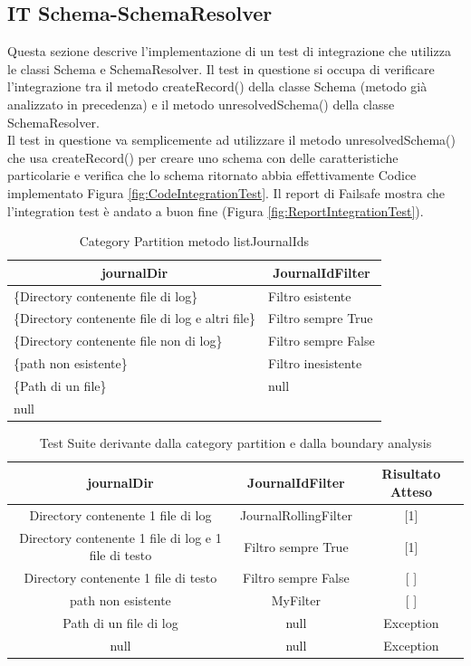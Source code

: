 \documentclass[12pt, a4paper]{article}
\begin{document}
\subsection{IT Schema-SchemaResolver}
Questa sezione descrive l'implementazione di un test di integrazione che utilizza le classi Schema e SchemaResolver.
Il test in questione si occupa di verificare l'integrazione tra il metodo createRecord() della classe Schema (metodo già
analizzato in precedenza) e il metodo unresolvedSchema() della classe SchemaResolver. \\
Il test in questione va semplicemente ad utilizzare il metodo unresolvedSchema() che usa createRecord() per creare uno schema
con delle caratteristiche particolarie e verifica che lo schema ritornato abbia effettivamente
Codice implementato Figura \ref{fig:CodeIntegrationTest}.
Il report di Failsafe mostra che l'integration test è andato a buon fine (Figura \ref{fig:ReportIntegrationTest}).
\newpage

\begin{table}[ht]
  \centering
  \caption[Journal: Category Partition]{Category Partition metodo listJournalIds}
  \begin{tabular}{|l|l|}
  \hline
  \multicolumn{1}{|c|}{journalDir} & \multicolumn{1}{|c|}{JournalIdFilter} \\
  \hline
  \{Directory contenente file di log\} & Filtro esistente \\
  \{Directory contenente file di log e altri file\} & Filtro sempre True \\
  \{Directory contenente file non di log\} & Filtro sempre False \\
  \{path non esistente\} & Filtro inesistente \\
  \{Path di un file\} & null \\
  null & \\
  \hline
  \end{tabular}
  \label{tab:categoryPartitionListJournalIds}
\end{table}

\begin{table}[ht]
  \centering
  \caption[Journal: Test Suite - Category Partition]{Test Suite derivante dalla category partition e dalla boundary analysis}
  \begin{tabular}{|c|c|c|}
  \hline
  journalDir & JournalIdFilter & Risultato Atteso \\
  \hline
  {Directory contenente 1 file di log} & JournalRollingFilter & [1] \\
  {Directory contenente 1 file di log e 1 file di testo} & Filtro sempre True & [1] \\
  {Directory contenente 1 file di testo} & Filtro sempre False & [ ] \\
  {path non esistente} & MyFilter & [ ] \\
  {Path di un file di log} & null & Exception \\
  null & null & Exception \\
  \hline
  \end{tabular}
  \label{tab:categoryPartition1ListJournalIds}
\end{table}
\end{document}
